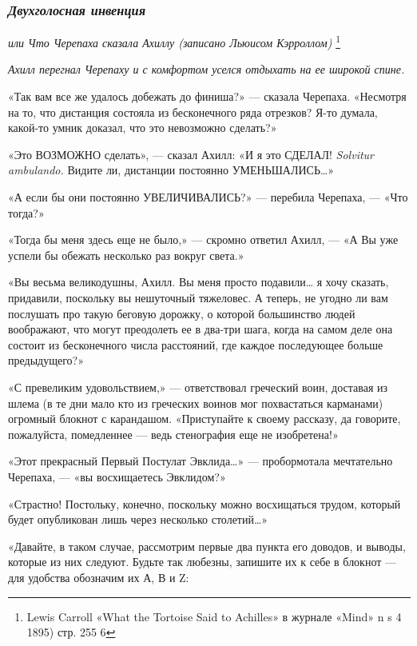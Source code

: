 \subsubsection{\texorpdfstring{\emph{Двухголосная инвенция} }{Двухголосная инвенци }}

\emph{или Что Черепаха сказала Ахиллу (записано Льюисом Кэрроллом)} \footnote{Lewis Carroll «What the Tortoise Said to Achilles» в журнале «Mind» n s 4 1895) стр. 255 6}

\emph{Ахилл перегнал Черепаху и с комфортом уселся отдыхать на ее широкой спине.}

«Так вам все же удалось добежать до финиша?» --- сказала Черепаха. «Несмотря на то, что дистанция состояла из бесконечного ряда отрезков? Я-то думала, какой-то умник доказал, что это невозможно сделать?»

«Это ВОЗМОЖНО сделать», --- сказал Ахилл: «И я это СДЕЛАЛ! \emph{Solvitur ambulando.} Видите ли, дистанции постоянно УМЕНЬШАЛИСЬ\ldots»

«А если бы они постоянно УВЕЛИЧИВАЛИСЬ?» --- перебила Черепаха, --- «Что тогда?»

«Тогда бы меня здесь еще не было,» --- скромно ответил Ахилл, --- «А Вы уже успели бы обежать несколько раз вокруг света.»

«Вы весьма великодушны, Ахилл. Вы меня просто подавили\ldots{} я хочу сказать, придавили, поскольку вы нешуточный тяжеловес. А теперь, не угодно ли вам послушать про такую беговую дорожку, о которой большинство людей воображают, что могут преодолеть ее в два-три шага, когда на самом деле она состоит из бесконечного числа расстояний, где каждое последующее больше предыдущего?»

«С превеликим удовольствием,» --- ответствовал греческий воин, доставая из шлема (в те дни мало кто из греческих воинов мог похвастаться карманами) огромный блокнот с карандашом. «Приступайте к своему рассказу, да говорите, пожалуйста, помедленнее --- ведь стенография еще не изобретена!»

«Этот прекрасный Первый Постулат Эвклида\ldots» --- пробормотала мечтательно Черепаха, --- «вы восхищаетесь Эвклидом?»

«Страстно! Постольку, конечно, поскольку можно восхищаться трудом, который будет опубликован лишь через несколько столетий\ldots»

«Давайте, в таком случае, рассмотрим первые два пункта его доводов, и выводы, которые из них следуют. Будьте так любезны, запишите их к себе в блокнот --- для удобства обозначим их А, В и Z:

